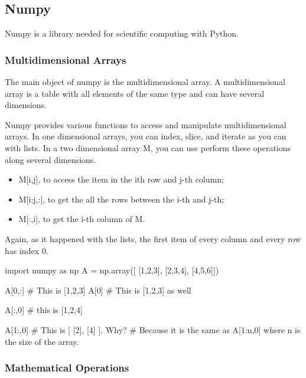 
\subsection{Numpy}

Numpy is a library needed for scientific computing with Python. 

\subsubsection{Multidimensional Arrays}

The main object of numpy is the multidimensional array. A multidimensional
array is a table with all elements of the same type and can have several
dimensions.

Numpy provides various functions to access and manipulate multidimensional
arrays. In one dimensional arrays, you can index, slice, and iterate as you can
with lists. In a two dimensional array M, you can use perform these operations
along several dimensions.

\begin{itemize}
 \item M[i,j], to access the item in the ith row and j-th column; 
 \item M[i:j,:], to get the all the rows between the i-th and j-th;
 \item M[:,i], to get the i-th column of M.
\end{itemize}

Again, as it happened with the lists, the first item of every column and every row has index 0.

\begin{python}
import numpy as np
A = np.array([
    [1,2,3],
    [2,3,4],
    [4,5,6]])

A[0,:] # This is [1,2,3]
A[0] # This is [1,2,3] as well

A[:,0] # this is [1,2,4]

A[1:,0] # This is [ [2], [4] ]. Why?
        # Because it is the same as A[1:n,0] where n is the size of the array.
\end{python}

\subsubsection{Mathematical Operations}


